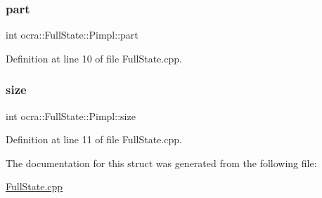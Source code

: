 \subsubsection{\texorpdfstring{part}{part}}
{\footnotesize\ttfamily int ocra\+::\+Full\+State\+::\+Pimpl\+::part}



Definition at line 10 of file Full\+State.\+cpp.

\hypertarget{structocra_1_1FullState_1_1Pimpl_a5deca911251aa5b774b3cf7f3f6bd5d4}{}\label{structocra_1_1FullState_1_1Pimpl_a5deca911251aa5b774b3cf7f3f6bd5d4} 
\subsubsection{\texorpdfstring{size}{size}}
{\footnotesize\ttfamily int ocra\+::\+Full\+State\+::\+Pimpl\+::size}



Definition at line 11 of file Full\+State.\+cpp.



The documentation for this struct was generated from the following file\+:\begin{DoxyCompactItemize}
\item 
\hyperlink{FullState_8cpp}{Full\+State.\+cpp}\end{DoxyCompactItemize}
